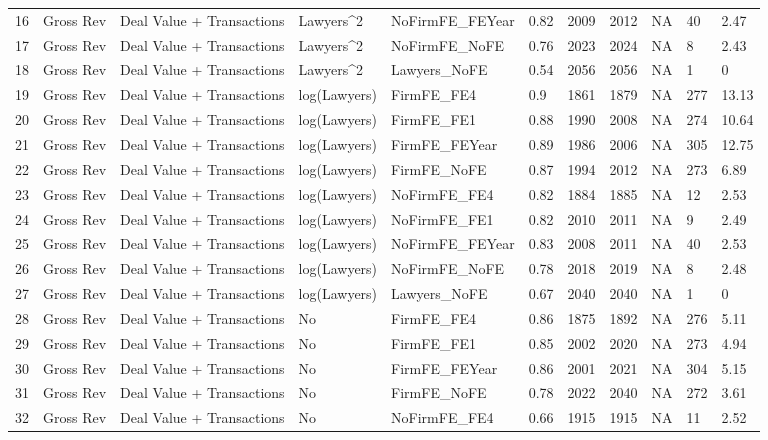 \documentclass{article}
\begin{document}
\begin{table}[H]
\begin{tabular}{rllllllllll}
  16 & Gross Rev & Deal Value + Transactions & Lawyers^2 & NoFirmFE\_FEYear & 0.82 & 2009 & 2012 & NA & 40 & 2.47 \\
  17 & Gross Rev & Deal Value + Transactions & Lawyers^2 & NoFirmFE\_NoFE & 0.76 & 2023 & 2024 & NA & 8 & 2.43 \\
  18 & Gross Rev & Deal Value + Transactions & Lawyers^2 & Lawyers\_NoFE & 0.54 & 2056 & 2056 & NA & 1 & 0 \\
  19 & Gross Rev & Deal Value + Transactions & log(Lawyers) & FirmFE\_FE4 & 0.9 & 1861 & 1879 & NA & 277 & 13.13 \\
  20 & Gross Rev & Deal Value + Transactions & log(Lawyers) & FirmFE\_FE1 & 0.88 & 1990 & 2008 & NA & 274 & 10.64 \\
  21 & Gross Rev & Deal Value + Transactions & log(Lawyers) & FirmFE\_FEYear & 0.89 & 1986 & 2006 & NA & 305 & 12.75 \\
  22 & Gross Rev & Deal Value + Transactions & log(Lawyers) & FirmFE\_NoFE & 0.87 & 1994 & 2012 & NA & 273 & 6.89 \\
  23 & Gross Rev & Deal Value + Transactions & log(Lawyers) & NoFirmFE\_FE4 & 0.82 & 1884 & 1885 & NA & 12 & 2.53 \\
  24 & Gross Rev & Deal Value + Transactions & log(Lawyers) & NoFirmFE\_FE1 & 0.82 & 2010 & 2011 & NA & 9 & 2.49 \\
  25 & Gross Rev & Deal Value + Transactions & log(Lawyers) & NoFirmFE\_FEYear & 0.83 & 2008 & 2011 & NA & 40 & 2.53 \\
  26 & Gross Rev & Deal Value + Transactions & log(Lawyers) & NoFirmFE\_NoFE & 0.78 & 2018 & 2019 & NA & 8 & 2.48 \\
  27 & Gross Rev & Deal Value + Transactions & log(Lawyers) & Lawyers\_NoFE & 0.67 & 2040 & 2040 & NA & 1 & 0 \\
  28 & Gross Rev & Deal Value + Transactions & No & FirmFE\_FE4 & 0.86 & 1875 & 1892 & NA & 276 & 5.11 \\
  29 & Gross Rev & Deal Value + Transactions & No & FirmFE\_FE1 & 0.85 & 2002 & 2020 & NA & 273 & 4.94 \\
  30 & Gross Rev & Deal Value + Transactions & No & FirmFE\_FEYear & 0.86 & 2001 & 2021 & NA & 304 & 5.15 \\
  31 & Gross Rev & Deal Value + Transactions & No & FirmFE\_NoFE & 0.78 & 2022 & 2040 & NA & 272 & 3.61 \\
  32 & Gross Rev & Deal Value + Transactions & No & NoFirmFE\_FE4 & 0.66 & 1915 & 1915 & NA & 11 & 2.52 \\

\end{tabular}
\end{table}
\end{document}
